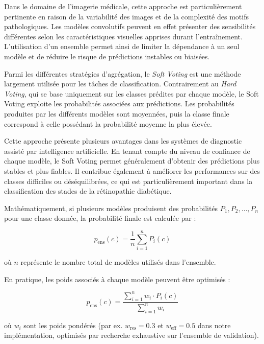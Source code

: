 \documentclass[12pt,a4paper,oneside]{report}
\begin{document}
Dans le domaine de l'imagerie médicale, cette approche est particulièrement pertinente en raison de la variabilité des images et de la complexité des motifs pathologiques. Les modèles convolutifs peuvent en effet présenter des sensibilités différentes selon les caractéristiques visuelles apprises durant l'entraînement. L'utilisation d'un ensemble permet ainsi de limiter la dépendance à un seul modèle et de réduire le risque de prédictions instables ou biaisées.

Parmi les différentes stratégies d'agrégation, le \textit{Soft Voting} est une méthode largement utilisée pour les tâches de classification. Contrairement au \textit{Hard Voting}, qui se base uniquement sur les classes prédites par chaque modèle, le Soft Voting exploite les probabilités associées aux prédictions. Les probabilités produites par les différents modèles sont moyennées, puis la classe finale correspond à celle possédant la probabilité moyenne la plus élevée.

Cette approche présente plusieurs avantages dans les systèmes de diagnostic assisté par intelligence artificielle. En tenant compte du niveau de confiance de chaque modèle, le Soft Voting permet généralement d'obtenir des prédictions plus stables et plus fiables. Il contribue également à améliorer les performances sur des classes difficiles ou déséquilibrées, ce qui est particulièrement important dans la classification des stades de la rétinopathie diabétique.

Mathématiquement, si plusieurs modèles produisent des probabilités $P_1, P_2, \ldots, P_n$ pour une classe donnée, la probabilité finale est calculée par :

\begin{equation}
p_{\text{ens}}(c) = \frac{1}{n} \sum_{i=1}^{n} P_i(c)
\label{eq:soft_voting}
\end{equation}

où $n$ représente le nombre total de modèles utilisés dans l'ensemble.

En pratique, les poids associés à chaque modèle peuvent être optimisés :

\begin{equation}
p_{\text{ens}}(c) = \frac{\sum_{i=1}^{n} w_i \cdot P_i(c)}{\sum_{i=1}^{n} w_i}
\label{eq:weighted_soft_voting}
\end{equation}

où $w_i$ sont les poids pondérés (par ex. $w_{\text{res}} = 0.3$ et $w_{\text{eff}} = 0.5$ dans notre implémentation, optimisés par recherche exhaustive sur l'ensemble de validation).
\end{document}
